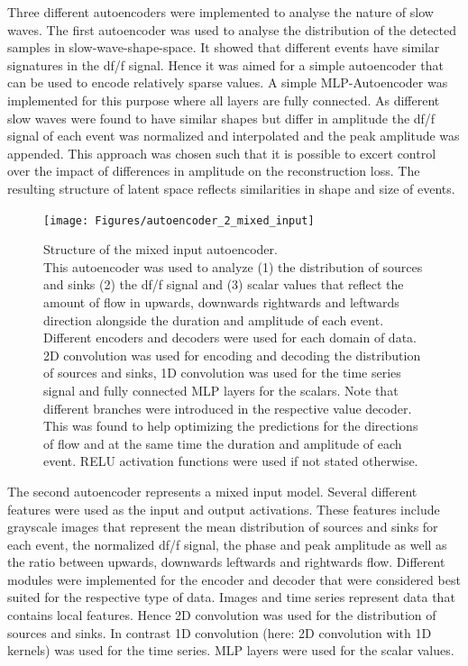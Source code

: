 Three different autoencoders were implemented to analyse the nature of slow waves. The first autoencoder was used to analyse the distribution of the detected samples in slow-wave-shape-space. It showed that different events have similar signatures in the df/f signal. Hence it was aimed for a simple autoencoder that can be used to encode relatively sparse values. A simple MLP-Autoencoder was implemented for this purpose where all layers are fully connected. As different slow waves were found to have similar shapes but differ in amplitude the df/f signal of each event was normalized and interpolated and the peak amplitude was appended. This approach was chosen such that it is possible to excert control over the impact of differences in amplitude on the reconstruction loss. The resulting structure of latent space reflects similarities in shape and size of events.\\
\begin{figure}[!htb]
\centering
\texttt{[image: Figures/autoencoder\_2\_mixed\_input]}
\decoRule
\caption[Structure of the mixed input autoencoder]{Structure of the mixed input autoencoder.\\ This autoencoder was used to analyze (1) the distribution of sources and sinks (2) the df/f signal and (3) scalar values that reflect the amount of flow in upwards, downwards rightwards and leftwards direction alongside the duration and amplitude of each event. Different encoders and decoders were used for each domain of data. 2D convolution was used for encoding and decoding the distribution of sources and sinks, 1D convolution was used for the time series signal and fully connected MLP layers for the scalars. Note that different branches were introduced in the respective value decoder. This was found to help optimizing the predictions for the directions of flow and at the same time the duration and amplitude of each event. RELU activation functions were used if not stated otherwise.}
\label{fig:autoencoder_2_mixed_input}
\end{figure}
The second autoencoder represents a mixed input model. Several different features were used as the input and output activations. These features include grayscale images that represent the mean distribution of sources and sinks for each event, the normalized df/f signal, the phase and peak amplitude as well as the ratio between upwards, downwards leftwards and rightwards flow. Different modules were implemented for the encoder and decoder that were considered best suited for the respective type of data. Images and time series represent data that contains local features. Hence 2D convolution was used for the distribution of sources and sinks. In contrast 1D convolution (here: 2D convolution with 1D kernels) was used for the time series. MLP layers were used for the scalar values. \\
